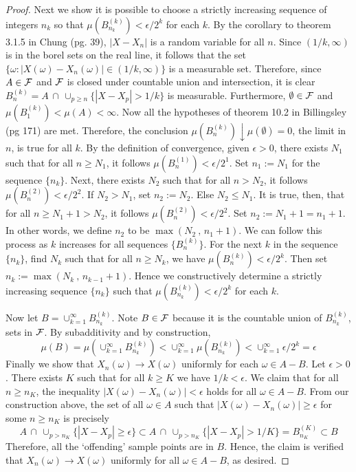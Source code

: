 \documentclass[letterpaper, 12pt]{article}
\newcommand{\Fc}{{\cal F}}
\begin{document}
\begin{proof}
Next we show it is possible to choose a strictly increasing sequence of integers $n_k$ so that $\mu(B_{n_k}^{(k)}) < \epsilon/2^k$ for each $k$.
By the corollary to theorem 3.1.5 in Chung (pg. 39), $|X - X_n|$ is a random variable for all $n$. 
Since $(1/k , \infty)$ is in the borel sets on the real line, it follows that the set $\{\omega : |X(\omega) - X_n(\omega)| \in (1/k , \infty)\}$ is a measurable set. 
Therefore, since $A \in \Fc$ and $\Fc$ is closed under countable union and intersection, it is clear $B_n^{(k)} = A\,\cap\,\cup_{p \geq n} \{|X - X_p| > 1/k\}$ is measurable.
Furthermore, $\emptyset \in \Fc$ and $\mu(B_{1}^{(k)}) < \mu(A) < \infty$. 
Now all the hypotheses of theorem 10.2 in Billingsley (pg 171) are met.
Therefore, the conclusion $\mu(B_{n}^{(k)}) \downarrow \mu(\emptyset) = 0$, the limit in $n$, is true for all $k$.
By the definition of convergence, given $\epsilon > 0$, there exists $N_1$ such that for all $n \geq N_1$, it follows $\mu(B_{n}^{(1)}) < \epsilon / 2^1$. Set $n_1 := N_1$ for the sequence $\{n_k\}$. 
Next, there exists $N_2$ such that for all $n > N_2$, it follows $\mu(B_{n}^{(2)}) < \epsilon/2^2$. If $N_2 > N_1$, set $n_2 := N_2$. 
Else $N_2 \leq N_1$. 
It is true, then, that for all $n \geq N_1 + 1 > N_2$, it follows $\mu(B_{n}^{(2)}) < \epsilon/2^2$. Set $n_2 := N_1 + 1 = n_1 + 1$. 
In other words, we define $n_2$ to be $\max(N_2 ~, \, n_1 + 1)$.
We can follow this process as $k$ increases for all sequences $\{B_{n}^{(k)}\}$.
For the next $k$ in the sequence $\{n_k\}$, find $N_k$ such that for all $n \geq N_k$, we have $\mu(B_{n}^{(k)}) < \epsilon / 2^k$. Then set $n_k := \max(N_k ~,\, n_{k-1}+1)$.
Hence we constructively determine a strictly increasing sequence $\{n_k\}$ such that $\mu(B_{n_k}^{(k)}) < \epsilon/2^k$ for each $k$.

Now let $B = \cup_{k=1}^{\infty} B_{n_k}^{(k)}$. Note $B \in \Fc$ because it is the countable union of $B_{n_k}^{(k)}$, sets in $\Fc$. By subadditivity and by construction, 
\[
\mu(B) = \mu(\cup_{k=1}^{\infty} B_{n_k}^{(k)}) < \cup_{k=1}^{\infty} \mu(B_{n_k}^{(k)}) < \cup_{k=1}^{\infty} \epsilon / 2^k = \epsilon
\]
Finally we show that $X_n(\omega) \to X(\omega)$ uniformly for each $\omega \in A - B$. 
Let $\epsilon > 0$.
There exists $K$ such that for all $k \geq K$ we have $1/k < \epsilon$.
We claim that for all $n \geq n_K$, the inequality $|X(\omega) - X_n(\omega)| < \epsilon$ holds for all $\omega \in A - B$. 
From our construction above, the set of all $\omega \in A$ such that $|X(\omega) - X_n(\omega)| \geq \epsilon$ for some $n \geq n_K$ is precisely
\[
A\, \cap \, \cup_{p > n_K} \{|X - X_p| \geq \epsilon\} \subset A\, \cap \, \cup_{p > n_K} \{|X - X_p| > 1 / K\} = B_{n_K}^{(K)} \subset B
\]
Therefore, all the `offending' sample points are in $B$. Hence, the claim is verified that $X_n(\omega) \to X(\omega)$ uniformly for all $\omega \in A - B$, as desired.
\end{proof}
\end{document}
